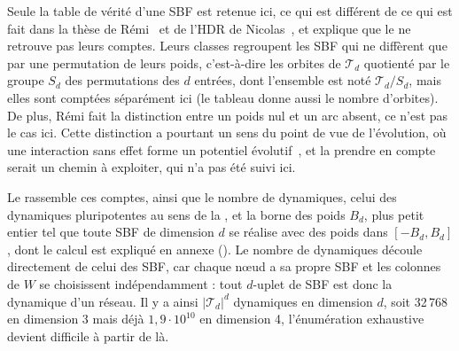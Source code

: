 \documentclass[12pt, a4paper]{article}
\begin{document}
Seule la table de vérité d'une SBF est retenue ici, ce qui est différent de ce qui est fait dans la thèse de Rémi~\cite{segretain2023} et de l'HDR de Nicolas~\cite{glade2022}, et explique que le  ne retrouve pas leurs comptes.
Leurs classes regroupent les SBF qui ne diffèrent que par une permutation de leurs poids, c'est-à-dire les orbites de $\mathcal{T}_d$ quotienté par le groupe $S_d$ des permutations des $d$ entrées, dont l'ensemble est noté $\mathcal{T}_d/S_d$, mais elles sont comptées séparément ici (le tableau donne aussi le nombre d'orbites).
De plus, Rémi fait la distinction entre un poids nul et un arc absent, ce n'est pas le cas ici.
Cette distinction a pourtant un sens du point de vue de l'évolution, où une interaction sans effet forme un potentiel évolutif~\cite{segretain2023}, et la prendre en compte serait un chemin à exploiter, qui n'a pas été suivi ici.

Le  rassemble ces comptes, ainsi que le nombre de dynamiques, celui des dynamiques pluripotentes au sens de la , et la borne des poids $B_d$, plus petit entier tel que toute SBF de dimension $d$ se réalise avec des poids dans $[-B_d, B_d]$, dont le calcul est expliqué en annexe ().
Le nombre de dynamiques découle directement de celui des SBF, car chaque nœud a sa propre SBF et les colonnes de $W$ se choisissent indépendamment : tout $d$-uplet de SBF est donc la dynamique d'un réseau.
Il y a ainsi $|\mathcal{T}_d|^d$ dynamiques en dimension $d$, soit 32\,768 en dimension 3 mais déjà $1{,}9 \cdot 10^{10}$ en dimension 4, l'énumération exhaustive devient difficile à partir de là.
\end{document}
